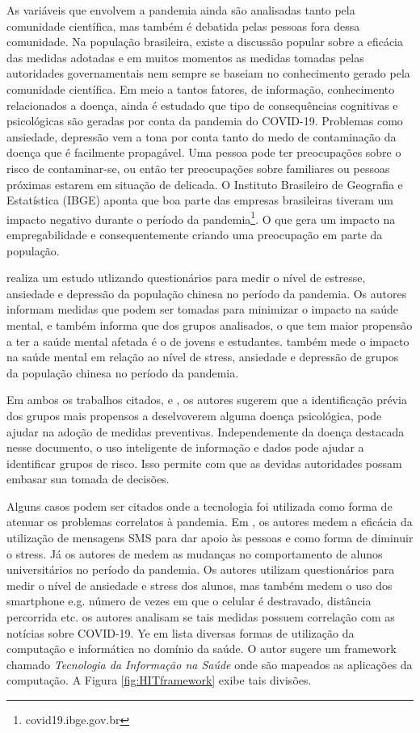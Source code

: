 \documentclass[11pt, notitlepage]{article} %
\begin{document}
As variáveis que envolvem a pandemia ainda são analisadas tanto pela comunidade científica, mas também é debatida pelas pessoas fora dessa comunidade. Na população brasileira, existe a discussão popular sobre a eficácia das medidas adotadas e em muitos momentos as medidas tomadas pelas autoridades governamentais nem sempre se baseiam no conhecimento gerado pela comunidade científica.
Em meio a tantos fatores, de informação, conhecimento relacionados a doença, ainda é estudado que tipo de consequências cognitivas e psicológicas são geradas por conta da pandemia do COVID-19. Problemas como ansiedade, depressão vem a tona por conta tanto do medo de contaminação da doença que é facilmente propagável. Uma pessoa pode ter preocupações sobre o risco de contaminar-se, ou então ter preocupações sobre familiares ou pessoas próximas estarem em situação de delicada. O Instituto Brasileiro de Geografia e Estatística (IBGE) aponta que boa parte das empresas brasileiras tiveram um impacto negativo durante o período da pandemia\footnote{covid19.ibge.gov.br}. O que gera um impacto na empregabilidade e consequentemente criando uma preocupação em parte da população. 

\cite{PMID:32298802} realiza um  estudo utlizando questionários para medir o nível de estresse, ansiedade e depressão da população chinesa no período da pandemia. Os autores informam medidas que podem ser tomadas para minimizar o impacto na saúde mental, e também informa que dos grupos analisados, o que tem maior propensão a ter a saúde mental afetada é o de jovens e estudantes. \cite{wang2020immediate} também mede o impacto na saúde mental em relação ao nível de stress, ansiedade e depressão de grupos da população chinesa no período da pandemia. 

Em ambos os trabalhos citados, \cite{PMID:32298802} e \cite{wang2020immediate}, os autores sugerem que a identificação prévia dos grupos mais propensos a deselvoverem alguma doença psicológica, pode ajudar na adoção de medidas preventivas. 
Independemente da doença destacada nesse documento, o uso inteligente de informação e dados pode ajudar a identificar grupos de risco. Isso permite com que as devidas autoridades possam embasar sua tomada de decisões.

Alguns casos podem ser citados onde a tecnologia foi utilizada como forma de atenuar os problemas correlatos à pandemia. Em \cite{info:doi/10.2196/19292}, os autores medem a eficácia da utilização de mensagens SMS para dar apoio às pessoas e como forma de diminuir o stress. Já os autores de \cite{info:doi/10.2196/20185} medem as mudanças no comportamento de alunos universitários no período da pandemia. Os autores utilizam questionários para medir o nível de ansiedade e stress dos alunos, mas também medem o uso dos smartphone e.g. número de vezes em que o celular é destravado, distância percorrida etc. os autores analisam se tais medidas possuem correlação com as notícias sobre COVID-19.
Ye em \cite{info:doi/10.2196/19866} lista diversas formas de utilização da computação e informática no domínio da saúde. O autor sugere um framework chamado \emph{Tecnologia da Informação na Saúde} onde são mapeados as aplicações da computação. A Figura \ref{fig:HITframework} exibe tais divisões.
\end{document}
